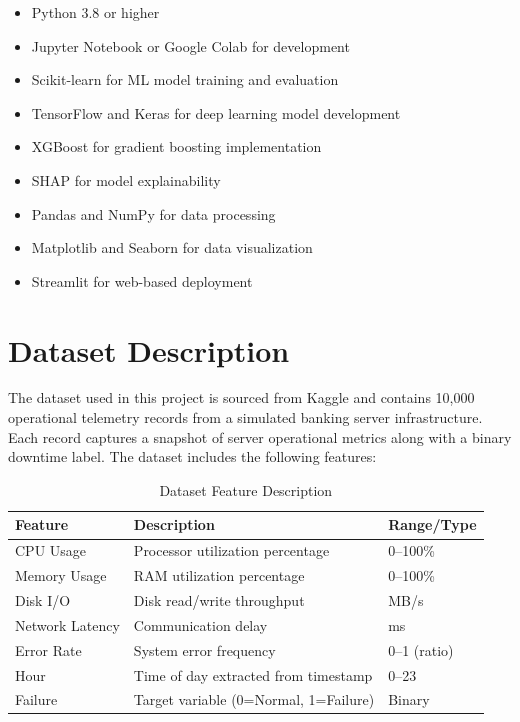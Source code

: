 \documentclass[12pt,letterpaper]{report}
\begin{document}
\begin{itemize}
  \item Python 3.8 or higher
  \item Jupyter Notebook or Google Colab for development
  \item Scikit-learn for ML model training and evaluation
  \item TensorFlow and Keras for deep learning model development
  \item XGBoost for gradient boosting implementation
  \item SHAP for model explainability
  \item Pandas and NumPy for data processing
  \item Matplotlib and Seaborn for data visualization
  \item Streamlit for web-based deployment
\end{itemize}

\section{Dataset Description}

The dataset used in this project is sourced from Kaggle and contains 10,000 operational telemetry records from a simulated banking server infrastructure. Each record captures a snapshot of server operational metrics along with a binary downtime label. The dataset includes the following features:

\begin{table}[H]
\centering
\caption{Dataset Feature Description}
\begin{tabular}{lll}
\toprule
\textbf{Feature} & \textbf{Description} & \textbf{Range/Type} \\
\midrule
CPU Usage & Processor utilization percentage & 0--100\% \\
Memory Usage & RAM utilization percentage & 0--100\% \\
Disk I/O & Disk read/write throughput & MB/s \\
Network Latency & Communication delay & ms \\
Error Rate & System error frequency & 0--1 (ratio) \\
Hour & Time of day extracted from timestamp & 0--23 \\
Failure & Target variable (0=Normal, 1=Failure) & Binary \\
\bottomrule
\end{tabular}
\end{table}
\end{document}
